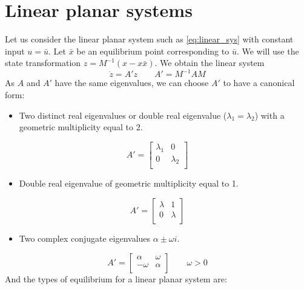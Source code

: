 \documentclass[12pt, openany]{report}
\theoremstyle{definition}
\begin{document}
\section{Linear planar systems}
Let us consider the linear planar system such as \eqref{eq:linear_sys} with constant input \(u=\bar u\). Let \(\bar x\) be an equilibrium point corresponding to \(\bar u\). We will use the state transformation \(z=M^{-1}(x-x\bar x)\). We obtain the linear system
\begin{equation}
    \dot z = A'z\qquad A' = M^{-1}AM
\end{equation}
As \(A\) and \(A'\) have the same eigenvalues, we can choose \(A'\) to have a canonical form:
\begin{itemize}
    \item Two distinct real eigenvalues or double real eigenvalue (\(\lambda_1=\lambda_2\)) with a geometric multiplicity equal to 2.
\end{itemize}
\begin{equation}
    A' = \begin{bmatrix}
        \lambda_1 & 0\\
        0 & \lambda_2\\
    \end{bmatrix}
\end{equation}
\begin{itemize}
    \item Double real eigenvalue of geometric multiplicity equal to 1.
\end{itemize}
\begin{equation}
    A' = \begin{bmatrix}
        \lambda & 1\\
        0 & \lambda\\
    \end{bmatrix}
\end{equation}
\begin{itemize}
    \item Two complex conjugate eigenvalues \(\alpha \pm \omega i\).
\end{itemize}
\begin{equation}
    A' = \begin{bmatrix}
        \alpha & \omega\\
        -\omega & \alpha\\
    \end{bmatrix} \qquad \omega >0
\end{equation}
And the types of equilibrium for a linear planar system are:
\end{document}
